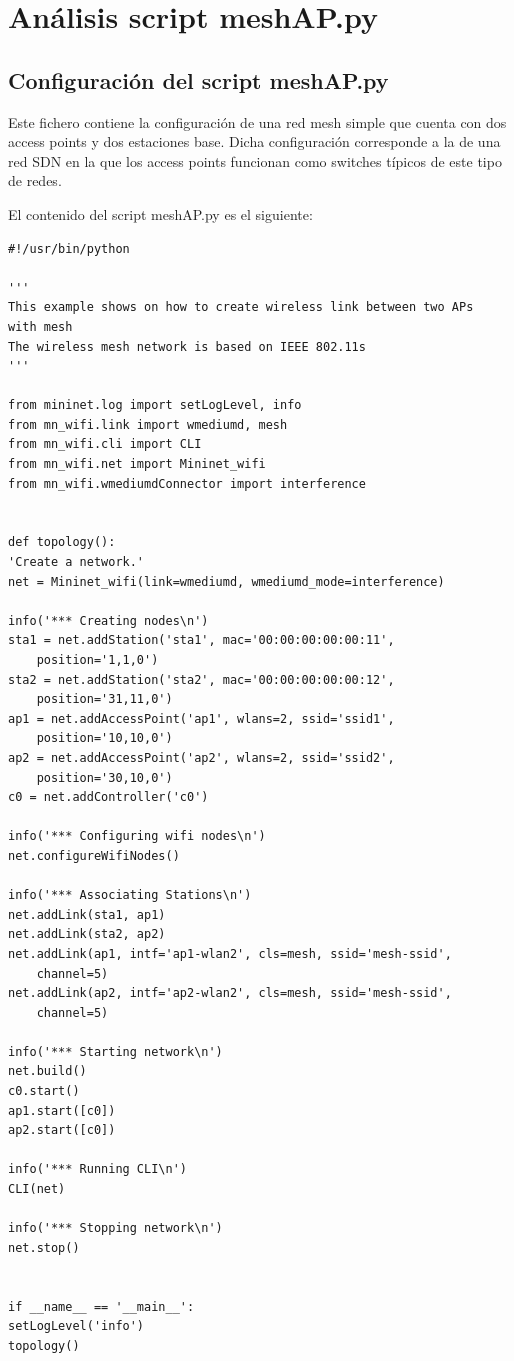 \documentclass[a4paper,12pt,twoside,spanish]{book}
\begin{document}
\chapter{Análisis script meshAP.py}
\section{Configuración del script meshAP.py}

Este fichero contiene la configuración de una red mesh simple que cuenta con dos access points y dos estaciones base. Dicha configuración corresponde a la de una red SDN en la que los access points funcionan como switches típicos de este tipo de redes.\par

El contenido del script meshAP.py es el siguiente: \par

\begin{lstlisting}
#!/usr/bin/python

'''
This example shows on how to create wireless link between two APs 
with mesh
The wireless mesh network is based on IEEE 802.11s
'''

from mininet.log import setLogLevel, info
from mn_wifi.link import wmediumd, mesh
from mn_wifi.cli import CLI
from mn_wifi.net import Mininet_wifi
from mn_wifi.wmediumdConnector import interference


def topology():
'Create a network.'
net = Mininet_wifi(link=wmediumd, wmediumd_mode=interference)

info('*** Creating nodes\n')
sta1 = net.addStation('sta1', mac='00:00:00:00:00:11', 
	position='1,1,0')
sta2 = net.addStation('sta2', mac='00:00:00:00:00:12', 
	position='31,11,0')
ap1 = net.addAccessPoint('ap1', wlans=2, ssid='ssid1', 
	position='10,10,0')
ap2 = net.addAccessPoint('ap2', wlans=2, ssid='ssid2', 
	position='30,10,0')
c0 = net.addController('c0')

info('*** Configuring wifi nodes\n')
net.configureWifiNodes()

info('*** Associating Stations\n')
net.addLink(sta1, ap1)
net.addLink(sta2, ap2)
net.addLink(ap1, intf='ap1-wlan2', cls=mesh, ssid='mesh-ssid', 
	channel=5)
net.addLink(ap2, intf='ap2-wlan2', cls=mesh, ssid='mesh-ssid', 
	channel=5)

info('*** Starting network\n')
net.build()
c0.start()
ap1.start([c0])
ap2.start([c0])

info('*** Running CLI\n')
CLI(net)

info('*** Stopping network\n')
net.stop()


if __name__ == '__main__':
setLogLevel('info')
topology()
\end{lstlisting}
\end{document}
